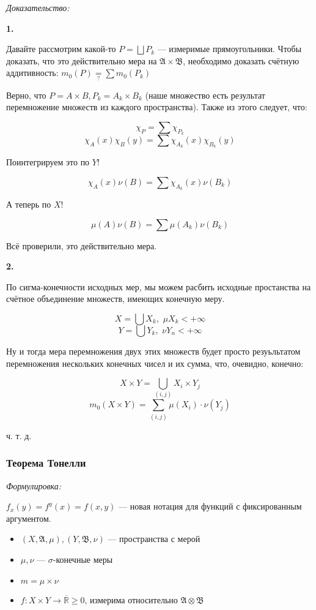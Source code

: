 \documentclass{article}
\def\dbl{\,\,}
\def\rinf{\overline{\mathbb{R}}}
\begin{document}
\textit{Доказательство:}

\textbf{1.}

Давайте рассмотрим какой-то $P = \bigsqcup P_k$ --- измеримые прямоугольники. Чтобы доказать, что это действительно мера на $\mathfrak{A} \times \mathfrak{B}$, необходимо доказать счётную аддитивность: $m_0(P) \underset{?}{=} \sum m_0(P_k)$

Верно, что $P = A \times B, P_k = A_k \times B_k$ (наше множество есть результат перемножение множеств из каждого пространства). Также из этого следует, что:

\[\chi_P = \sum \chi_{P_k}\]
\[\chi_A(x)\chi_B(y) = \sum \chi_{A_k}(x)\chi_{B_k}(y)\]

Поинтегрируем это по $Y$!

\[\chi_A(x) \nu(B) = \sum \chi_{A_k}(x)\nu(B_k)\]

А теперь по $X$!

\[\mu(A)\nu(B) = \sum \mu(A_k) \nu(B_k)\]

Всё проверили, это действительно мера.

\textbf{2.}

По сигма-конечности исходных мер, мы можем расбить исходные простанства на счётное объединение множеств, имеющих конечную меру.

\[X = \bigcup X_k, \dbl \mu X_k < +\infty\]
\[Y = \bigcup Y_k, \dbl \nu Y_n < +\infty\]

Ну и тогда мера перемножения двух этих множеств будет просто резуьльтатом перемножения нескольких конечных чисел и их сумма, что, очевидно, конечно:

\[X \times Y = \bigcup_{(i, j)} X_i \times Y_j\]
\[m_0(X \times Y) = \sum_{(i, j)} \mu(X_i) \cdot \nu(Y_j)\]

ч. т. д. 

\subsubsection{Теорема Тонелли}
\textit{Формулировка:}

$f_x(y) = f^y(x) = f(x, y)$ --- новая нотация для функций с фиксированным аргументом.

\begin{itemize}
    \item $(X, \mathfrak{A}, \mu), (Y, \mathfrak{B}, \nu)$ --- пространства с мерой
    \item $\mu, \nu$ --- $\sigma$-конечные меры
    \item $m = \mu \times \nu$
    \item $f: X \times Y \rightarrow \rinf \ge 0$, измерима относительно $\mathfrak{A} \otimes \mathfrak{B}$
\end{itemize}
\end{document}
